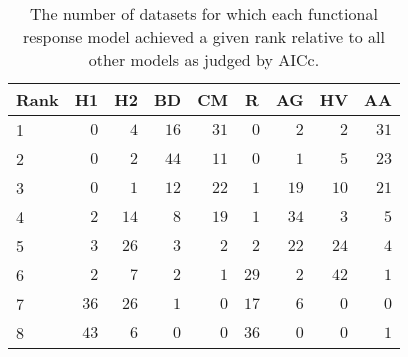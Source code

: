 \begin{table}[!tbp]
\caption{The number of datasets for which each functional response model achieved a given rank relative to all other models as judged by AICc.\label{table:AICc_rankings}} 
\begin{center}
\begin{tabular}{lrrrrrrrr}
\hline\hline
\multicolumn{1}{l}{Rank}&\multicolumn{1}{c}{H1}&\multicolumn{1}{c}{H2}&\multicolumn{1}{c}{BD}&\multicolumn{1}{c}{CM}&\multicolumn{1}{c}{R}&\multicolumn{1}{c}{AG}&\multicolumn{1}{c}{HV}&\multicolumn{1}{c}{AA}\tabularnewline
\hline
1&$ 0$&$ 4$&$16$&$31$&$ 0$&$ 2$&$ 2$&$31$\tabularnewline
2&$ 0$&$ 2$&$44$&$11$&$ 0$&$ 1$&$ 5$&$23$\tabularnewline
3&$ 0$&$ 1$&$12$&$22$&$ 1$&$19$&$10$&$21$\tabularnewline
4&$ 2$&$14$&$ 8$&$19$&$ 1$&$34$&$ 3$&$ 5$\tabularnewline
5&$ 3$&$26$&$ 3$&$ 2$&$ 2$&$22$&$24$&$ 4$\tabularnewline
6&$ 2$&$ 7$&$ 2$&$ 1$&$29$&$ 2$&$42$&$ 1$\tabularnewline
7&$36$&$26$&$ 1$&$ 0$&$17$&$ 6$&$ 0$&$ 0$\tabularnewline
8&$43$&$ 6$&$ 0$&$ 0$&$36$&$ 0$&$ 0$&$ 1$\tabularnewline
\hline
\end{tabular}\end{center}
\end{table}
